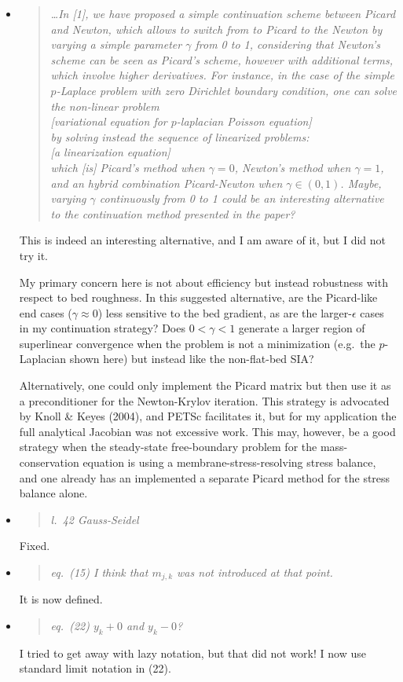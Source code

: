 \documentclass[11pt,reqno]{amsart}
\newcommand{\reply}[2]{
\medskip\medskip
\item  \begin{quote}
\emph{#1}
\end{quote}

\medskip
\noindent #2}
\begin{document}
\begin{itemize}
\reply{\dots In [1], we have proposed a simple continuation scheme
between Picard and Newton, which allows to switch from to Picard to the Newton
by varying a simple parameter $\gamma$ from 0 to 1, considering that Newton’s scheme
can be seen as Picard’s scheme, however with additional terms, which involve
higher derivatives. For instance, in the case of the simple $p$-Laplace problem with
zero Dirichlet boundary condition, one can solve the non-linear problem \medskip \\
\phantom{foobar} [\emph{variational equation for $p$-laplacian Poisson equation}] \medskip \\
by solving instead the sequence of linearized problems: \medskip \\
\phantom{foobar} [\emph{a linearization equation}] \medskip \\
which [is] Picard's method when $\gamma=0$, Newton’s method when $\gamma=1$,
and an hybrid combination Picard-Newton when $\gamma \in (0,1)$.  Maybe, varying $\gamma$
continuously from 0 to 1 could be an interesting alternative to the continuation
method presented in the paper?}
{This is indeed an interesting alternative, and I am aware of it, but I did not try it.

My primary concern here is not about efficiency but instead robustness with respect to bed roughness.  In this suggested alternative, are the Picard-like end cases ($\gamma\approx 0$) less sensitive to the bed gradient, as are the larger-$\epsilon$ cases in my continuation strategy?  Does $0<\gamma<1$ generate a larger region of superlinear convergence when the problem is not a minimization (e.g.~the $p$-Laplacian shown here) but instead like the non-flat-bed SIA?

Alternatively, one could only implement the Picard matrix but then use it as a preconditioner for the Newton-Krylov iteration.  This strategy is advocated by Knoll \& Keyes (2004), and PETSc facilitates it, but for my application the full analytical Jacobian was not excessive work.  This may, however, be a good strategy when the steady-state free-boundary problem for the mass-conservation equation is using a membrane-stress-resolving stress balance, and one already has an implemented a separate Picard method for the stress balance alone.}

\reply{l.~42 Gauss-Seidel}
{Fixed.}

\reply{eq.~(15) I think that $m_{j,k}$ was not introduced at that point.}
{It is now defined.}

\reply{eq.~(22) $y_{k} + 0$ and $y_k - 0$?}
{I tried to get away with lazy notation, but that did not work!  I now use standard limit notation in (22).}


\end{itemize}
\end{document}
